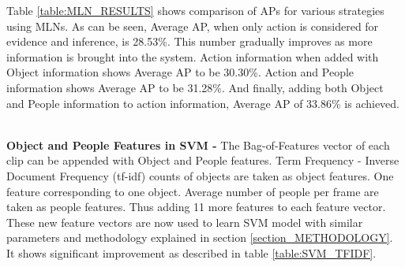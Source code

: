 Table \ref{table:MLN_RESULTS} shows comparison of APs for various strategies using MLNs.
As can be seen, Average AP, when only action is considered for evidence and inference, is 28.53\%. 
This number gradually improves as more information is brought into the system.
Action information when added with Object information shows Average AP to be 30.30\%. 
Action and People information shows Average AP to be 31.28\%.
And finally, adding both Object and People information to action information,
Average AP of 33.86\% is achieved.


~\\

{\bf Object and People Features in SVM - }
The Bag-of-Features vector of each clip can be appended with Object and People features.
Term Frequency - Inverse Document Frequency (tf-idf) counts of objects are taken as object features.
One feature corresponding to one object.
Average number of people per frame are taken as people features.
Thus adding 11 more features to each feature vector.
These new feature vectors are now used to learn SVM model with similar parameters 
and methodology explained in section \ref{section_METHODOLOGY}.
It shows significant improvement as described in table \ref{table:SVM_TFIDF}.


